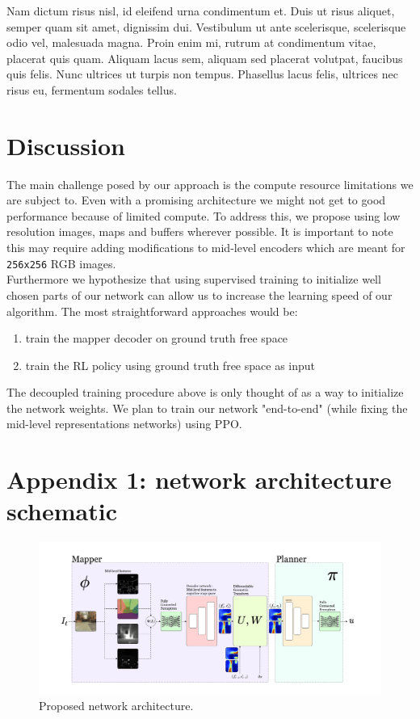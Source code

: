 \documentclass{cta-author}
\begin{document}
Nam dictum risus nisl, id eleifend urna condimentum et. Duis ut risus aliquet, semper quam sit amet, dignissim dui. Vestibulum ut ante scelerisque, scelerisque odio vel, malesuada magna. Proin enim mi, rutrum at condimentum vitae, placerat quis quam. Aliquam lacus sem, aliquam sed placerat volutpat, faucibus quis felis. Nunc ultrices ut turpis non tempus. Phasellus lacus felis, ultrices nec risus eu, fermentum sodales tellus.



\section{Discussion}
The main challenge posed by our approach is the compute resource limitations we are subject to. Even with a promising architecture we might not get to good performance because of limited compute. To address this, we propose using low resolution images, maps and buffers wherever possible. It is important to note this may require adding modifications to mid-level encoders which are meant for \texttt{256x256} RGB images. \\

Furthermore we hypothesize that using supervised training to initialize well chosen parts of our network can allow us to increase the learning speed of our algorithm. The most straightforward approaches would be:
\begin{enumerate}
    \item train the mapper decoder on ground truth free space
    \item train the RL policy using ground truth free space as input
\end{enumerate}

The decoupled training procedure above is only thought of as a way to initialize the network weights. We plan to train our network "end-to-end" (while fixing the mid-level representations networks) using PPO.
\printbibliography
\newpage
\section*{Appendix 1: network architecture schematic}
\begin{figure}[tbph]
  \centering
  \includegraphics[width=\textwidth]{figures/network_schematic2.pdf}
  \caption{Proposed network architecture.}
  \vspace{-3mm}
  \label{fig:net_arch}
\end{figure}
\end{document}
